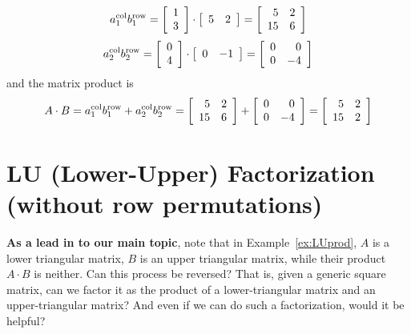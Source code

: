 $$
a_1^{\rm col}  b_1^{\rm row}= \left[\begin{array}{c} 1 \\
3  \end{array}\right] \cdot \left[\begin{array}{cc}5 & 2 \end{array}\right] = \left[\begin{array}{rr} 5 & 2\\
15 & 6 \end{array}\right]$$
%
$$
a_2^{\rm col}  b_2^{\rm row}= \left[\begin{array}{c} 0\\
4 \end{array}\right] \cdot \left[\begin{array}{rr}0 & -1 \end{array}\right] = \left[\begin{array}{rr} 0 & 0\\
0 & -4 \end{array}\right]$$
and the matrix product is
%
$$A\cdot B=a_1^{\rm col}  b_1^{\rm row} + a_2^{\rm col}  b_2^{\rm row} = \left[\begin{array}{rr} 5 & 2\\
15 & 6 \end{array}\right] + \left[\begin{array}{rr} 0 & 0\\
0 & -4 \end{array}\right]=\left[\begin{array}{rr} 5 & 2\\
15 & 2 \end{array}\right]$$

\Qed



\section{LU (Lower-Upper) Factorization (without row permutations)}
\label{sec:LUwithoutPermutations}

\textbf{As a lead in to our main topic}, note that in Example~\ref{ex:LUprod}, $A$ is a lower triangular matrix, $B$ is an upper triangular matrix, while their product $A\cdot B$ is neither. Can this process be reversed? That is, given a generic square matrix, can we factor it as the product of a lower-triangular matrix and an upper-triangular matrix? And even if we can do such a factorization, would it be helpful?\\

